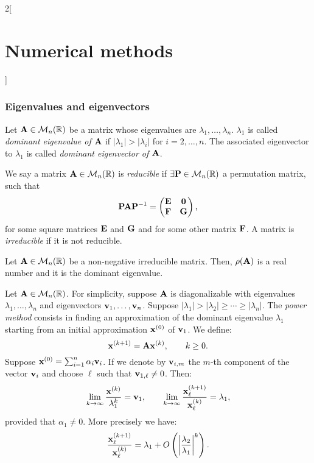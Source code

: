 \documentclass[../../../main.tex]{subfiles}
\begin{document}
\begin{multicols}{2}[\section{Numerical methods}]
\subsubsection*{Eigenvalues and eigenvectors}
\begin{definition}
    Let $\vb{A}\in\mathcal{M}_n(\mathbb{R})$ be a matrix whose eigenvalues are $\lambda_1,\ldots,\lambda_n$. $\lambda_1$ is called \textit{dominant eigenvalue of $\vb{A}$} if $|\lambda_1|>|\lambda_i|$ for $i=2,\ldots,n$. The associated eigenvector to $\lambda_1$ is called \textit{dominant eigenvector of $\vb{A}$}.
\end{definition}
\begin{definition}
    We say a matrix $\vb{A}\in\mathcal{M}_n(\mathbb{R})$ is \textit{reducible} if $\exists\vb{P}\in\mathcal{M}_n(\mathbb{R})$ a permutation matrix, such that $$\vb{P}\vb{A}\vb{P}^{-1}=
    \begin{pmatrix}
        \vb{E} & \vb{0}\\
        \vb{F} & \vb{G}
    \end{pmatrix},$$ for some square matrices $\vb{E}$ and $\vb{G}$ and for some other matrix $\vb{F}$. A matrix is \textit{irreducible} if it is not reducible.
\end{definition}
\begin{theorem}
    Let $\vb{A}\in\mathcal{M}_n(\mathbb{R})$ be a non-negative irreducible matrix. Then, $\rho(\vb{A})$ is a real number and it is the dominant eigenvalue.
\end{theorem}
\begin{method}
    Let $\vb{A}\in\mathcal{M}_n(\mathbb{R})$. For simplicity, suppose $\vb{A}$ is diagonalizable with eigenvalues $\lambda_1,\ldots,\lambda_n$ and eigenvectors $\vb{v}_1,\ldots,\vb{v}_n$. Suppose $|\lambda_1|>|\lambda_2|\geq\cdots\geq|\lambda_n|$. The \textit{power method} consists in finding an approximation of the dominant eigenvalue $\lambda_1$ starting from an initial approximation $\vb{x}^{(0)}$ of $\vb{v}_1$. We define: $$\vb{x}^{(k+1)}=\vb{A}\vb{x}^{(k)},\qquad k\geq 0.$$ Suppose $\vb{x}^{(0)}=\sum_{i=1}^n\alpha_i\vb{v}_i$. If we denote by $\vb{v}_{i,m}$ the $m$-th component of the vector $\vb{v}_i$ and choose $\ell$ such that $\vb{v}_{1,\ell}\ne0$. Then: $$\lim_{k\to\infty}\frac{\vb{x}^{(k)}}{\lambda_1^k}=\vb{v}_1,\qquad\lim_{k\to\infty}\frac{\vb{x}_\ell^{(k+1)}}{\vb{x}_\ell^{(k)}}=\lambda_1,$$ provided that $\alpha_1\ne0$. More precisely we have: $$\frac{\vb{x}_\ell^{(k+1)}}{\vb{x}_\ell^{(k)}}=\lambda_1+O\left(\left|\frac{\lambda_2}{\lambda_1}\right|^k\right).$$

\end{method}
\end{multicols}
\end{document}
